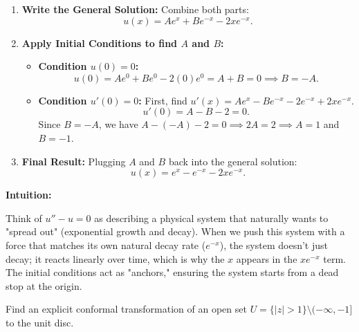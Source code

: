 \begin{solution}
\begin{enumerate}
    \item \textbf{Write the General Solution:}
        Combine both parts:
        \[ u(x) = A e^x + B e^{-x} - 2x e^{-x}. \]

    \item \textbf{Apply Initial Conditions to find $A$ and $B$:}
        \begin{itemize}
            \item \textbf{Condition $u(0) = 0$:}
            \[ u(0) = A e^0 + B e^0 - 2(0)e^0 = A + B = 0 \implies B = -A. \]
            \item \textbf{Condition $u'(0) = 0$:}
            First, find $u'(x) = A e^x - B e^{-x} - 2e^{-x} + 2x e^{-x}$.
            \[ u'(0) = A - B - 2 = 0. \]
            Since $B = -A$, we have $A - (-A) - 2 = 0 \implies 2A = 2 \implies A = 1$ and $B = -1$.
        \end{itemize}

    \item \textbf{Final Result:}
        Plugging $A$ and $B$ back into the general solution:
        \[ u(x) = e^x - e^{-x} - 2x e^{-x}. \]
\end{enumerate}


\textbf{Intuition:}

Think of $u'' - u = 0$ as describing a physical system that naturally wants to "spread out" (exponential growth and decay). When we push this system with a force that matches its own natural decay rate ($e^{-x}$), the system doesn't just decay; it reacts linearly over time, which is why the $x$ appears in the $x e^{-x}$ term. The initial conditions act as "anchors," ensuring the system starts from a dead stop at the origin.
\end{solution}

\begin{exercise}
\label{analysis:2011:3}
Find an explicit conformal transformation of an open set $U = \{ |z| > 1 \} \setminus (-\infty, -1]$ to the unit disc.
\end{exercise}

